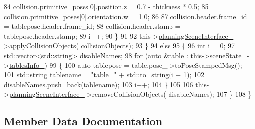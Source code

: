 \begin{DoxyCode}
84                         collision.primitive\_poses[0].position.z = 0.7 - thickness * 0.5;
85                         collision.primitive\_poses[0].orientation.w = 1.0;
86 
87                         collision.header.frame\_id = tablepose.header.frame\_id;
88                         collision.header.stamp = tablepose.header.stamp;
89                         i++;
90                     \}
91 
92                     this->\hyperlink{classsm__moveit__4_1_1cl__moveit__z__client_1_1CpConstraintTableWorkspaces_a24d96bcde58af9e8aacbb4737859ac95}{planningSceneInterface\_}->applyCollisionObjects(
      collisionObjects);
93                 \}
94                 \textcolor{keywordflow}{else}
95                 \{
96                     \textcolor{keywordtype}{int} i = 0;
97                     std::vector<std::string> disableNames;
98                     \textcolor{keywordflow}{for} (\textcolor{keyword}{auto} &table : this->\hyperlink{classsm__moveit__4_1_1cl__moveit__z__client_1_1CpConstraintTableWorkspaces_ae2d0e4852e944e8a870d5936de646d47}{sceneState\_}->\hyperlink{classsm__moveit__4_1_1cl__perception__system_1_1CpSceneState_a95f74dd16566d97e017650ccdf4b8a46}{tablesInfo\_})
99                     \{
100                         \textcolor{keyword}{auto} tablepose = table.pose\_->toPoseStampedMsg();
101                         std::string tablename = \textcolor{stringliteral}{"table\_"} + std::to\_string(i + 1);
102                         disableNames.push\_back(tablename);
103                         i++;
104                     \}
105 
106                     this->\hyperlink{classsm__moveit__4_1_1cl__moveit__z__client_1_1CpConstraintTableWorkspaces_a24d96bcde58af9e8aacbb4737859ac95}{planningSceneInterface\_}->removeCollisionObjects(
      disableNames);
107                 \}
108             \}
\end{DoxyCode}


\subsection{Member Data Documentation}
\mbox{\label{classsm__moveit__4_1_1cl__moveit__z__client_1_1CpConstraintTableWorkspaces_a24d96bcde58af9e8aacbb4737859ac95}} 
